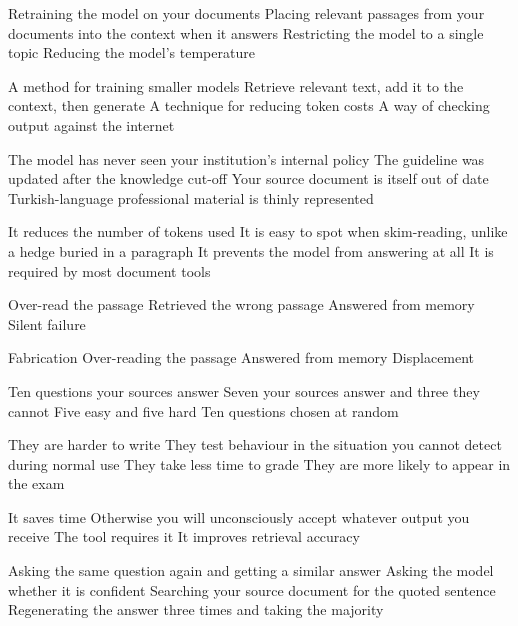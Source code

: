 \documentclass[11pt,a4paper]{article}
\begin{document}

\begin{questions}

  {Retraining the model on your documents}
  {Placing relevant passages from your documents into the context when it answers}
  {Restricting the model to a single topic}
  {Reducing the model's temperature}

  {A method for training smaller models}
  {Retrieve relevant text, add it to the context, then generate}
  {A technique for reducing token costs}
  {A way of checking output against the internet}

  {The model has never seen your institution's internal policy}
  {The guideline was updated after the knowledge cut-off}
  {Your source document is itself out of date}
  {Turkish-language professional material is thinly represented}

  {It reduces the number of tokens used}
  {It is easy to spot when skim-reading, unlike a hedge buried in a paragraph}
  {It prevents the model from answering at all}
  {It is required by most document tools}

  {Over-read the passage}
  {Retrieved the wrong passage}
  {Answered from memory}
  {Silent failure}

  {Fabrication}
  {Over-reading the passage}
  {Answered from memory}
  {Displacement}

  {Ten questions your sources answer}
  {Seven your sources answer and three they cannot}
  {Five easy and five hard}
  {Ten questions chosen at random}

  {They are harder to write}
  {They test behaviour in the situation you cannot detect during normal use}
  {They take less time to grade}
  {They are more likely to appear in the exam}

  {It saves time}
  {Otherwise you will unconsciously accept whatever output you receive}
  {The tool requires it}
  {It improves retrieval accuracy}

  {Asking the same question again and getting a similar answer}
  {Asking the model whether it is confident}
  {Searching your source document for the quoted sentence}
  {Regenerating the answer three times and taking the majority}

\end{questions}
\end{document}
